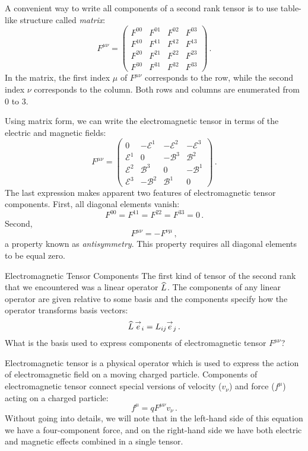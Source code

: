 A convenient way to write all components of a second rank tensor is to
use table-like structure called \emph{matrix}:
\[
F^{\mu\nu}=
\begin{pmatrix}
  F^{00} & F^{01} & F^{02} & F^{03}\\
  F^{10} & F^{11} & F^{12} & F^{13}\\
  F^{20} & F^{21} & F^{22} & F^{23}\\
  F^{30} & F^{31} & F^{32} & F^{33}
\end{pmatrix}\,.
\]
In the matrix, the first index $\mu$ of $F^{\mu\nu}$ corresponds to
the row, while the second index $\nu$ corresponds to the column. Both
rows and columns are enumerated from $0$ to $3$.

Using matrix form, we can write the electromagnetic tensor in terms
of the electric and magnetic fields:
\[
F^{\mu\nu}=
\begin{pmatrix}
  0 & -\mathcal{E}^1 & -\mathcal{E}^2 & -\mathcal{E}^3\\
  \mathcal{E}^1 & 0 & -\mathcal{B}^3 & \mathcal{B}^2\\
  \mathcal{E}^2 & \mathcal{B}^3 & 0 & -\mathcal{B}^1\\
  \mathcal{E}^3 & -\mathcal{B}^2 & \mathcal{B}^1 & 0
\end{pmatrix}\,.
\]
The last expression makes apparent two features of electromagnetic
tensor components. First, all diagonal elements vanish:
\[
F^{00} = F^{11} = F^{22} = F^{33} = 0\,.
\]
Second,
\[
F^{\mu\nu} = -F^{\nu\mu}\,,
\]
a property known as \emph{antisymmetry}. This property requires all
diagonal elements to be equal zero.
\begin{mybio}{Electromagnetic Tensor Components}
  The first kind of tensor of the second rank that we encountered was
  a linear
  operator $\widehat{L}$. The components of any linear operator are given
  relative to some basis and the components specify how the operator
  transforms basis vectors:
  \[
  \widehat{L}\,\overset{\rightarrow}{e}_i = L_{ij}\overset{\rightarrow}{e}_j\,.
  \]
  What is the basis used to express components of electromagnetic
  tensor $F^{\mu\nu}$?

  Electromagnetic tensor is a physical operator which is used to express
  the action of electromagnetic field on a moving charged particle.
  Components of electromagnetic tensor connect special versions
  of velocity ($v_\nu$) and force ($f^\mu$) acting on a charged particle:
  \[
  f^\mu = qF^{\mu\nu}v_\nu\,.
  \]
  Without going into details, we will note that in the left-hand side
  of this equation we have a four-component force, and on the
  right-hand side we have both electric and magnetic effects combined
  in a single tensor.
\end{mybio}


